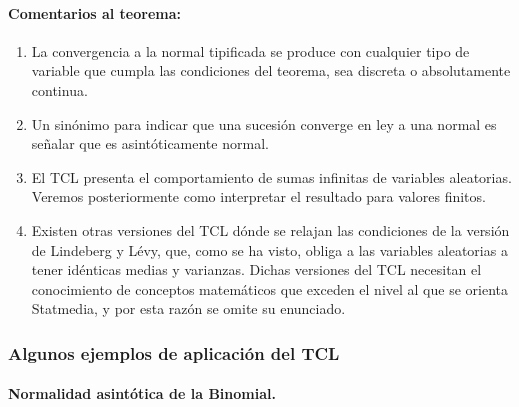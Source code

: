 \documentclass[
]{article}
\providecommand{\tightlist}{%
  \setlength{\itemsep}{0pt}\setlength{\parskip}{0pt}}
\begin{document}
\paragraph{Comentarios al teorema:}\label{comentarios-al-teorema}

\begin{enumerate}
\def\labelenumi{\arabic{enumi}.}
\tightlist
\item
  La convergencia a la normal tipificada se produce con cualquier tipo de variable que cumpla las condiciones del teorema, sea discreta o absolutamente continua.
\item
  Un sinónimo para indicar que una sucesión converge en ley a una normal es señalar que es asintóticamente normal.
\item
  El TCL presenta el comportamiento de sumas infinitas de variables aleatorias. Veremos posteriormente como interpretar el resultado para valores finitos.
\item
  Existen otras versiones del TCL dónde se relajan las condiciones de la versión de Lindeberg y Lévy, que, como se ha visto, obliga a las variables aleatorias a tener idénticas medias y varianzas. Dichas versiones del TCL necesitan el conocimiento de conceptos matemáticos que exceden el nivel al que se orienta Statmedia, y por esta razón se omite su enunciado.
\end{enumerate}

\subsubsection{Algunos ejemplos de aplicación del TCL}\label{algunos-ejemplos-de-aplicaciuxf3n-del-tcl}

\paragraph{Normalidad asintótica de la Binomial.}\label{normalidad-asintuxf3tica-de-la-binomial.}
\end{document}
